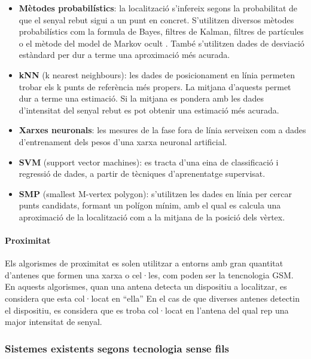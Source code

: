 \begin{itemize}

    \item \textbf{Mètodes probabilístics}: la localització s'infereix segons la probabilitat de que el senyal rebut sigui a un punt en concret. S'utilitzen diversos mètodes probabilístics com la formula de Bayes, filtres de Kalman\cite{glanzer}, filtres de partícules o el mètode del model de Markov ocult \cite{evennou}. També s'utilitzen dades de desviació estàndard per dur a terme una aproximació més acurada.
    \item \textbf{kNN} (k nearest neighbours): les dades de posicionament en línia permeten trobar els k punts de referència més propers. La mitjana d'aquests permet dur a terme una estimació. Si la mitjana es pondera amb les dades d'intensitat del senyal rebut es pot obtenir una estimació més acurada.
    \item \textbf{Xarxes neuronals}: les mesures de la fase fora de línia serveixen com a dades d'entrenament dels pesos d'una xarxa neuronal artificial.
    \item \textbf{SVM} (support vector machines): es tracta d'una eina de classificació i regressió de dades, a partir de tècniques d’aprenentatge supervisat.
    \item \textbf{SMP} (smallest M-vertex polygon): s'utilitzen les dades en línia per cercar punts candidats, formant un polígon mínim, amb el qual es calcula una aproximació de la localització com a la mitjana de la posició dels vèrtex.

\end{itemize}

\paragraph{Proximitat}

Els algorismes de proximitat es solen utilitzar a entorns amb gran quantitat d'antenes que formen una xarxa o cel·les, com poden ser la tencnologia GSM. En aquests algorismes, quan una antena detecta un dispositiu a localitzar, es considera que esta col·locat en ``ella'' En el cas de que diverses antenes detectin el dispositiu, es considera que es troba col·locat en l'antena del qual rep una major intensitat de senyal.

\subsubsection{Sistemes existents segons tecnologia sense fils}

